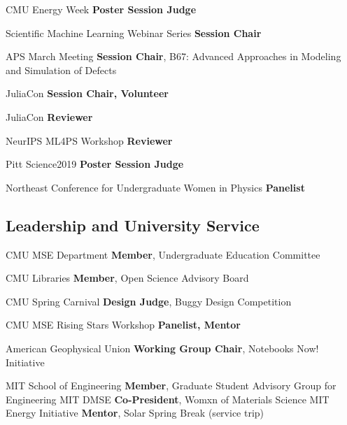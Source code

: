 {CMU Energy Week}
{\textbf{Poster Session Judge}}
{}


{Scientific Machine Learning Webinar Series}
{\textbf{Session Chair}}
{}

{APS March Meeting}
{\textbf{Session Chair}, B67: Advanced Approaches in Modeling and Simulation of Defects}
{}

{JuliaCon}
{\textbf{Session Chair, Volunteer}}
{}

{JuliaCon}
{\textbf{Reviewer}}
{}

{NeurIPS ML4PS Workshop}
{\textbf{Reviewer}}
{}

{Pitt Science2019}
{\textbf{Poster Session Judge}}
{}

{Northeast Conference for Undergraduate Women in Physics}
{\textbf{Panelist}}
{}

\vspace{-2.5mm}
\subsection{Leadership and University Service}
\vspace{-1mm}
                      {CMU MSE Department}
                      {\textbf{Member}, Undergraduate Education Committee}
                      {}

                      {CMU Libraries}
                      {\textbf{Member}, Open Science Advisory Board}
                      {}

                      {CMU Spring Carnival}
                      {\textbf{Design Judge}, Buggy Design Competition}
                      {}
                      
                      {CMU MSE Rising Stars Workshop}
                      {\textbf{Panelist, Mentor}}
                      {}


{American Geophysical Union}
{\textbf{Working Group Chair}, Notebooks Now! Initiative}
{}

{MIT School of Engineering}
{\textbf{Member}, Graduate Student Advisory Group for Engineering}
{}
{MIT DMSE}
{\textbf{Co-President}, Womxn of Materials Science}
{}
{MIT Energy Initiative}
{\textbf{Mentor}, Solar Spring Break (service trip)}
{}


